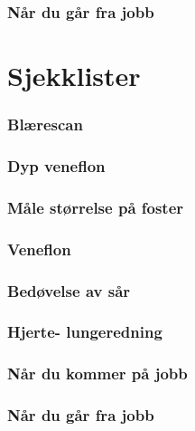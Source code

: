\documentclass[a4paper,12pt,twoside]{memoir}
\begin{document}
				\section{Når du går fra jobb}
		




	\part{Sjekklister}
		\section{Blærescan}
		\section{Dyp veneflon}
		\section{Måle størrelse på foster}
		\section{Veneflon}
		\section{Bedøvelse av sår}
		\section{Hjerte- lungeredning}
		\section{Når du kommer på jobb}
		\section{Når du går fra jobb}




\backmatter

 
     
	{}
	     
	
	
	\listoffigures
	
	\listoftables
\end{document}
